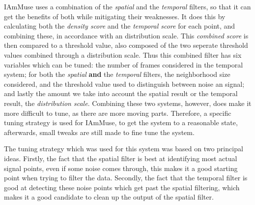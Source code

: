 IAmMuse uses a combination of the \textit{spatial} and the \textit{temporal} filters, so that it can get the benefits of both while mitigating their weaknesses.
It does this by calculating both the \textit{density score} and the \textit{temporal score} for each point, and combining these, in accordance with an distribution scale. 
This \textit{combined score} is then compared to a threshold value, also composed of the two seperate threshold values combined through a distribution scale.
Thus this combined filter has six variables which can be tuned: the number of frames considered in the temporal system; for both the \textit{spatial} \textbf{and} the \textit{temporal} filters, the neighborhood size considered, and the threshold value used to distinguish between noise an signal; and lastly the amount we take into account the spatial result or the temporal result, the \textit{distribution scale}.
Combining these two systems, however, does make it more difficult to tune, as there are more moving parts.
Therefore, a specific tuning strategy is used for IAmMuse, to get the system to a reasonable state, afterwards, small tweaks are still made to fine tune the system.

The tuning strategy which was used for this system was based on two principal ideas.
Firstly, the fact that the spatial filter is best at identifying most actual signal points, even if some noise comes through, this makes it a good starting point when trying to filter the data.
Secondly, the fact that the temporal filter is good at detecting these noise points which get past the spatial filtering, which makes it a good candidate to clean up the output of the spatial filter.

